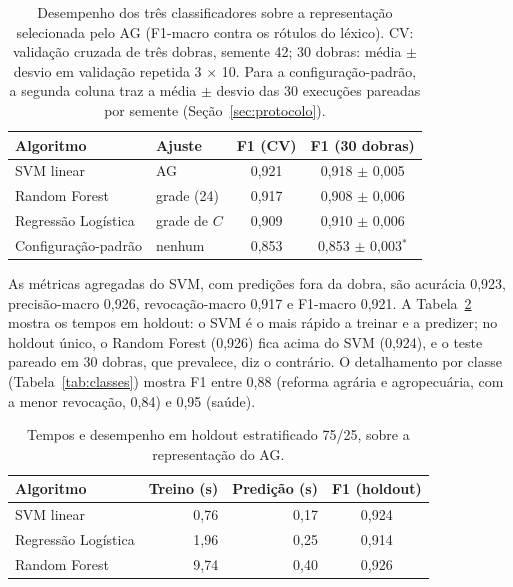 \documentclass[fleqn,10pt]{SelfArx}
\begin{document}
\begin{table}[hbt]
\caption{Desempenho dos três classificadores sobre a representação selecionada pelo AG (F1-macro contra os rótulos do léxico). CV: validação cruzada de três dobras, semente 42; 30 dobras: média $\pm$ desvio em validação repetida 3 $\times$ 10. Para a configuração-padrão, a segunda coluna traz a média $\pm$ desvio das 30 execuções pareadas por semente (Seção~\ref{sec:protocolo}).}
\label{tab:classificadores}
\centering
\small
\begin{tabular}{llcc}
\toprule
Algoritmo & Ajuste & F1 (CV) & F1 (30 dobras) \\
\midrule
SVM linear & AG & 0,921 & 0,918 $\pm$ 0,005 \\
Random Forest & grade (24) & 0,917 & 0,908 $\pm$ 0,006 \\
Regressão Logística & grade de $C$ & 0,909 & 0,910 $\pm$ 0,006 \\
Configuração-padrão & nenhum & 0,853 & 0,853 $\pm$ 0,003$^{*}$ \\
\bottomrule
\end{tabular}
\end{table}

As métricas agregadas do SVM, com predições fora da dobra, são acurácia 0,923, precisão-macro 0,926, revocação-macro 0,917 e F1-macro 0,921. A Tabela~\ref{tab:tempos} mostra os tempos em holdout: o SVM é o mais rápido a treinar e a predizer; no holdout único, o Random Forest (0,926) fica acima do SVM (0,924), e o teste pareado em 30 dobras, que prevalece, diz o contrário. O detalhamento por classe (Tabela~\ref{tab:classes}) mostra F1 entre 0,88 (reforma agrária e agropecuária, com a menor revocação, 0,84) e 0,95 (saúde).

\begin{table}[hbt]
\caption{Tempos e desempenho em holdout estratificado 75/25, sobre a representação do AG.}
\label{tab:tempos}
\centering
\small
\begin{tabular}{lrrc}
\toprule
Algoritmo & Treino (s) & Predição (s) & F1 (holdout) \\
\midrule
SVM linear & 0,76 & 0,17 & 0,924 \\
Regressão Logística & 1,96 & 0,25 & 0,914 \\
Random Forest & 9,74 & 0,40 & 0,926 \\
\bottomrule
\end{tabular}
\end{table}
\end{document}
